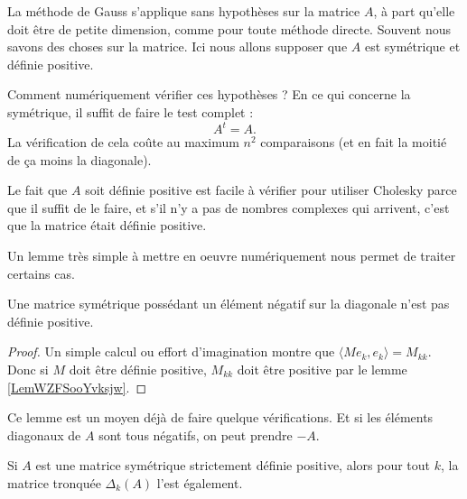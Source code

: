 La méthode de Gauss s'applique sans hypothèses sur la matrice \( A\), à part qu'elle doit être de petite dimension, comme pour toute méthode directe. Souvent nous savons des choses sur la matrice. Ici nous allons supposer que \( A\) est symétrique et définie positive.

Comment numériquement vérifier ces hypothèses ? En ce qui concerne la symétrique, il suffit de faire le test complet :
\begin{equation}
    A^t=A.
\end{equation}
La vérification de cela coûte au maximum \( n^2\) comparaisons (et en fait la moitié de ça moins la diagonale). 

Le fait que \( A\) soit définie positive est facile à vérifier pour utiliser Cholesky parce que il suffit de le faire, et s'il n'y a pas de nombres complexes qui arrivent, c'est que la matrice était définie positive.

Un lemme très simple à mettre en oeuvre numériquement nous permet de traiter certains cas.
\begin{lemma}
    Une matrice symétrique possédant un élément négatif sur la diagonale n'est pas définie positive.
\end{lemma}

\begin{proof}
    Un simple calcul ou effort d'imagination montre que \( \langle Me_k, e_k\rangle =M_{kk}\). Donc si \( M\) doit être définie positive, \( M_{kk}\) doit être positive par le lemme \ref{LemWZFSooYvksjw}.
\end{proof}
Ce lemme est un moyen déjà de faire quelque vérifications. Et si les éléments diagonaux de \( A\) sont tous négatifs, on peut prendre \( -A\).

\begin{lemma}       \label{LEMooVEIYooZbShQb}
    Si \( A\) est une matrice symétrique strictement définie positive, alors pour tout \( k\), la matrice tronquée \( \Delta_k(A)\) l'est également.    
\end{lemma}

